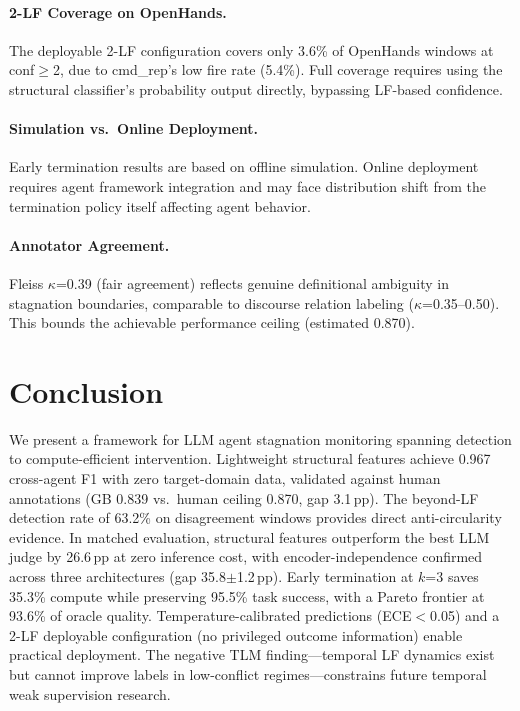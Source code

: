 \documentclass[11pt,a4paper]{article}
\begin{document}
\paragraph{2-LF Coverage on OpenHands.}
The deployable 2-LF configuration covers only 3.6\% of OpenHands windows at conf$\geq$2, due to cmd\_rep's low fire rate (5.4\%). Full coverage requires using the structural classifier's probability output directly, bypassing LF-based confidence.

\paragraph{Simulation vs.\ Online Deployment.}
Early termination results are based on offline simulation. Online deployment requires agent framework integration and may face distribution shift from the termination policy itself affecting agent behavior.

\paragraph{Annotator Agreement.}
Fleiss $\kappa$=0.39 (fair agreement) reflects genuine definitional ambiguity in stagnation boundaries, comparable to discourse relation labeling ($\kappa$=0.35--0.50). This bounds the achievable performance ceiling (estimated 0.870).

\section{Conclusion}
\label{sec:conclusion}

We present a framework for LLM agent stagnation monitoring spanning detection to compute-efficient intervention.
Lightweight structural features achieve 0.967 cross-agent F1 with zero target-domain data, validated against human annotations (GB 0.839 vs.\ human ceiling 0.870, gap 3.1\,pp).
The beyond-LF detection rate of 63.2\% on disagreement windows provides direct anti-circularity evidence.
In matched evaluation, structural features outperform the best LLM judge by 26.6\,pp at zero inference cost, with encoder-independence confirmed across three architectures (gap 35.8$\pm$1.2\,pp).
Early termination at $k$=3 saves 35.3\% compute while preserving 95.5\% task success, with a Pareto frontier at 93.6\% of oracle quality.
Temperature-calibrated predictions (ECE$<$0.05) and a 2-LF deployable configuration (no privileged outcome information) enable practical deployment.
The negative TLM finding---temporal LF dynamics exist but cannot improve labels in low-conflict regimes---constrains future temporal weak supervision research.
\end{document}
